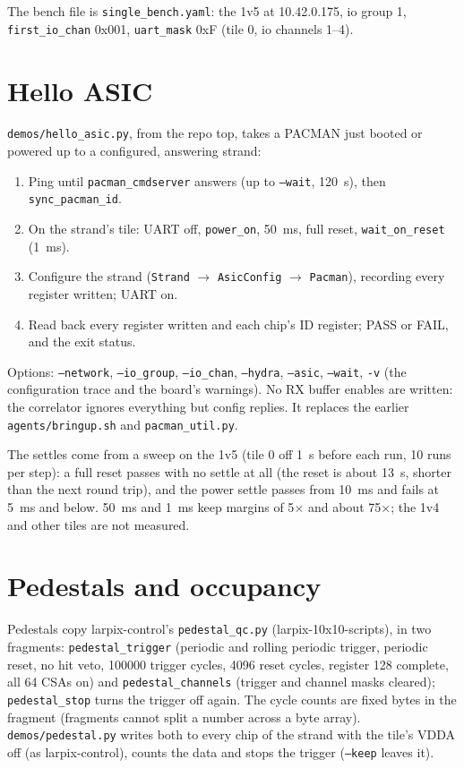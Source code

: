 \documentclass[11pt]{article}
\newcommand{\h}[1]{\texttt{#1}}
\begin{document}
The bench file is \h{single\_bench.yaml}:  the 1v5 at 10.42.0.175, io group 1, \h{first\_io\_chan} 0x001,
\h{uart\_mask} 0xF (tile 0, io channels 1--4).

\section{Hello ASIC}

\h{demos/hello\_asic.py}, from the repo top, takes a PACMAN just booted or powered up to a configured, answering strand:
\begin{enumerate}
\item Ping until \h{pacman\_cmdserver} answers (up to \h{--wait}, 120~s), then \h{sync\_pacman\_id}.
\item On the strand's tile:  UART off, \h{power\_on}, 50~ms, full reset, \h{wait\_on\_reset} (1~ms).
\item Configure the strand (\h{Strand} $\to$ \h{AsicConfig} $\to$ \h{Pacman}), recording every register written;
  UART on.
\item Read back every register written and each chip's ID register;  PASS or FAIL, and the exit status.
\end{enumerate}
Options:  \h{--network}, \h{--io\_group}, \h{--io\_chan}, \h{--hydra}, \h{--asic}, \h{--wait}, \h{-v} (the
configuration trace and the board's warnings).  No RX buffer enables are written:  the correlator ignores everything
but config replies.  It replaces the earlier \h{agents/bringup.sh} and \h{pacman\_util.py}.

The settles come from a sweep on the 1v5 (tile 0 off 1~s before each run, 10 runs per step):  a full reset passes
with no settle at all (the reset is about 13~\textmu{}s, shorter than the next round trip), and the power settle
passes from 10~ms and fails at 5~ms and below.  50~ms and 1~ms keep margins of 5$\times$ and about 75$\times$;  the
1v4 and other tiles are not measured.

\section{Pedestals and occupancy}

Pedestals copy larpix-control's \h{pedestal\_qc.py} (larpix-10x10-scripts), in two fragments:
\h{pedestal\_trigger} (periodic and rolling periodic trigger, periodic reset, no hit veto, 100000 trigger cycles,
4096 reset cycles, register 128 complete, all 64 CSAs on) and \h{pedestal\_channels} (trigger and channel masks
cleared);  \h{pedestal\_stop} turns the trigger off again.  The cycle counts are fixed bytes in the fragment
(fragments cannot split a number across a byte array).  \h{demos/pedestal.py} writes both to every chip of the
strand with the tile's VDDA off (as larpix-control), counts the data and stops the trigger (\h{--keep} leaves it).
\end{document}
